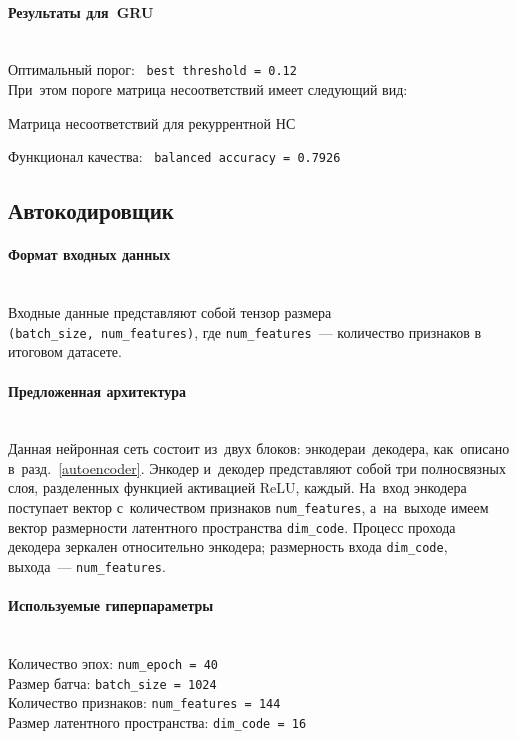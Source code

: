 \paragraph{Результаты для~GRU}~\\
Оптимальный порог: \ \texttt{best\ threshold = 0.12}\\
При~этом пороге матрица несоответствий имеет следующий вид:

\begin{table}[!h]
	\centering
	\caption{Матрица несоответствий для рекуррентной НС}\medskip
	
	\label{GRU_conf_mtrx}
\end{table}

\noindent
Функционал качества: \ \texttt{balanced\ accuracy = 0.7926}


\clearpage
\subsection{Автокодировщик}
\paragraph{Формат входных данных}~\\
Входные данные представляют собой тензор размера \texttt{(batch\_size,~num\_features)}, 
где \texttt{num\_features}~--- количество признаков в итоговом датасете.

\vspace{-2.5ex}
\paragraph{Предложенная архитектура}~\\
Данная нейронная сеть состоит из~двух блоков: энкодера\linebreak и~декодера, как~описано в~разд.~\ref{autoencoder}.
Энкодер и~декодер представляют собой три полносвязных слоя, разделенных функцией активацией ReLU, каждый.
На~вход энкодера поступает вектор с~количеством признаков \texttt{num\_features}, а~на~выходе
имеем вектор размерности латентного пространства \texttt{dim\_code}. 
Процесс прохода декодера зеркален относительно энкодера; размерность входа \texttt{dim\_code}, выхода~--- \texttt{num\_features}.

\vspace{-2.5ex}
\paragraph{Используемые гиперпараметры}~\\
Количество эпох: \texttt{num\_epoch = 40}\\
Размер батча: \texttt{batch\_size = 1024}\\
Количество признаков: \texttt{num\_features = 144}\\
Размер латентного пространства: \texttt{dim\_code = 16}


